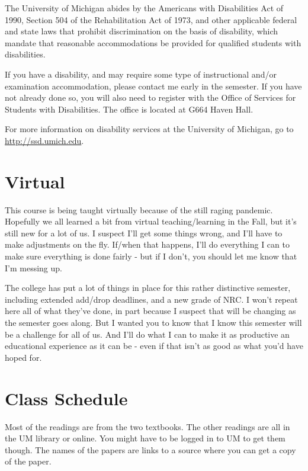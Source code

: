 \documentclass[
]{article}
\begin{document}
The University of Michigan abides by the Americans with Disabilities Act
of 1990, Section 504 of the Rehabilitation Act of 1973, and other
applicable federal and state laws that prohibit discrimination on the
basis of disability, which mandate that reasonable accommodations be
provided for qualified students with disabilities.

If you have a disability, and may require some type of instructional
and/or examination accommodation, please contact me early in the
semester. If you have not already done so, you will also need to
register with the Office of Services for Students with Disabilities. The
office is located at G664 Haven Hall.

For more information on disability services at the University of
Michigan, go to \url{http://ssd.umich.edu}.

\hypertarget{virtual}{%
\section{Virtual}\label{virtual}}

This course is being taught virtually because of the still raging
pandemic. Hopefully we all learned a bit from virtual teaching/learning
in the Fall, but it's still new for a lot of us. I suspect I'll get some
things wrong, and I'll have to make adjustments on the fly. If/when that
happens, I'll do everything I can to make sure everything is done fairly
- but if I don't, you should let me know that I'm messing up.

The college has put a lot of things in place for this rather distinctive
semester, including extended add/drop deadlines, and a new grade of NRC.
I won't repeat here all of what they've done, in part because I suspect
that will be changing as the semester goes along. But I wanted you to
know that I know this semester will be a challenge for all of us. And
I'll do what I can to make it as productive an educational experience as
it can be - even if that isn't as good as what you'd have hoped for.

\newpage

\hypertarget{class-schedule}{%
\section{Class Schedule}\label{class-schedule}}

Most of the readings are from the two textbooks. The other readings are
all in the UM library or online. You might have to be logged in to UM to
get them though. The names of the papers are links to a source where you
can get a copy of the paper.
\end{document}
